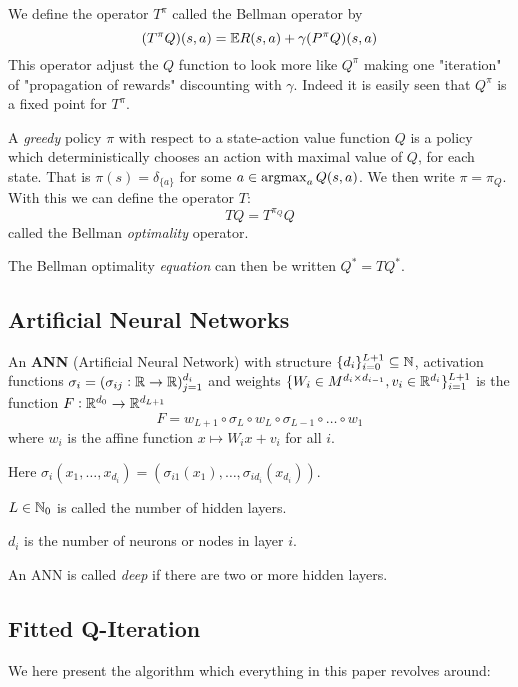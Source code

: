 We define the operator $T^\pi$ called the Bellman operator by
\[ (T^\pi Q)(s, a) = \mathbb{E} R(s, a) + \gamma (P^\pi Q)(s, a) \]
This operator adjust the $Q$ function to look more like $Q^\pi$ making one
"iteration" of "propagation of rewards" discounting with $\gamma$.
Indeed it is easily seen that $Q^\pi$ is a fixed point for $T^\pi$.

A \emph{greedy} policy $\pi$ with respect to a state-action value function
$Q$ is a policy which deterministically chooses an action with maximal value of $Q$,
for each state. That is $\pi(s) = \delta_{\{a\}}$ for some $a \in \operatorname*{argmax}_a Q(s,a)$.
We then write $\pi = \pi_Q$. With this we can define the operator $T$:
\[ T Q = T^{\pi_Q} Q \]
called the Bellman \emph{optimality} operator.

The Bellman optimality \emph{equation} can then be written $Q^* = TQ^*$.



\subsection{Artificial Neural Networks}

\begin{defn}\label{def_ANN}
	An \textbf{ANN} (Artificial Neural Network) with structure
	$\{ d_i \}_{i=0}^{L+1} \subseteq \mathbb{N}$,
	activation functions $\sigma_i = (\sigma_{ij} : \mathbb{R} \to \mathbb{R})_{j=1}^{d_i}$
	and weights $\{ W_i \in M^{d_i \times d_{i-1}}, v_i \in \mathbb{R}^{d_i} \}_{i=1}^{L+1}$
	is the function $F:\mathbb{R}^{d_0} \to \mathbb{R}^{d_{L+1}}$ 
	\[ F = w_{L+1} \circ \sigma_L \circ w_L \circ \sigma_{L-1} \circ \dots \circ w_1 \]
	where $w_i$ is the affine function $x \mapsto W_i x + v_i$ for all $i$.

	Here $\sigma_i(x_1, \dots, x_{d_i})
	= (\sigma_{i1}(x_1), \dots, \sigma_{id_{i}}(x_{d_{i}}))$.

	$L \in \mathbb{N}_0$ is called the number of hidden layers.

	$d_i$ is the number of neurons or nodes in layer $i$.
\end{defn}

An ANN is called \emph{deep} if there are two or more hidden layers.

\subsection{Fitted Q-Iteration}

We here present the algorithm which everything in this paper revolves around:

